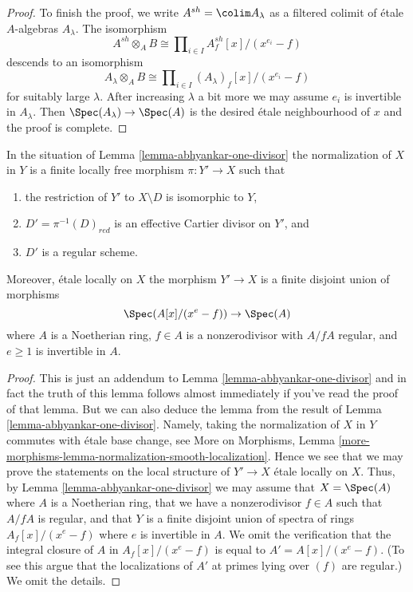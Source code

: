 \begin{proof}
\medskip\noindent
To finish the proof, we write $A^{sh} = \colim A_\lambda$
as a filtered colimit of \'etale $A$-algebras $A_\lambda$.
The isomorphism
$$
A^{sh} \otimes_A B \cong
\prod\nolimits_{i \in I} A^{sh}_f[x]/(x^{e_i} - f)
$$
descends to an isomorphism
$$
A_\lambda \otimes_A B \cong \prod\nolimits_{i \in I}
(A_\lambda)_f[x]/(x^{e_i} - f)
$$
for suitably large $\lambda$. After increasing $\lambda$ a bit
more we may assume $e_i$ is invertible in $A_\lambda$. Then
$\Spec(A_\lambda) \to \Spec(A)$ is the desired \'etale neighbourhood
of $x$ and the proof is complete.
\end{proof}

\begin{lemma}
\label{lemma-extend-tame-covering-normal}
In the situation of Lemma \ref{lemma-abhyankar-one-divisor}
the normalization of $X$ in $Y$ is a finite locally free morphism
$\pi : Y' \to X$ such that
\begin{enumerate}
\item the restriction of $Y'$ to $X \setminus D$ is isomorphic to $Y$,
\item $D' = \pi^{-1}(D)_{red}$ is an effective Cartier divisor on $Y'$, and
\item $D'$ is a regular scheme.
\end{enumerate}
Moreover, \'etale locally on $X$ the morphism $Y' \to X$ is a finite disjoint
union of morphisms
$$
\Spec(A[x]/(x^e - f)) \to \Spec(A)
$$
where $A$ is a Noetherian ring, $f \in A$ is a nonzerodivisor with
$A/fA$ regular, and $e \geq 1$ is invertible in $A$.
\end{lemma}

\begin{proof}
This is just an addendum to Lemma \ref{lemma-abhyankar-one-divisor}
and in fact the truth of this lemma follows almost immediately if
you've read the proof of that lemma. But we can also deduce
the lemma from the result of Lemma \ref{lemma-abhyankar-one-divisor}.
Namely, taking the normalization of $X$ in $Y$ commutes with
\'etale base change, see More on Morphisms, Lemma
\ref{more-morphisms-lemma-normalization-smooth-localization}.
Hence we see that we may prove the statements on the local structure
of $Y' \to X$ \'etale locally on $X$. Thus, by
Lemma \ref{lemma-abhyankar-one-divisor} we may assume that
$X = \Spec(A)$ where $A$ is a Noetherian ring, that we have a
nonzerodivisor $f\in A$ such that $A/fA$ is regular, and that $Y$
is a finite disjoint union of spectra of rings $A_f[x]/(x^e - f)$
where $e$ is invertible in $A$. We omit the verification that
the integral closure of $A$ in $A_f[x]/(x^e - f)$ is
equal to $A' = A[x]/(x^e - f)$. (To see this argue that
the localizations of $A'$ at primes lying over $(f)$ are regular.)
We omit the details.
\end{proof}

